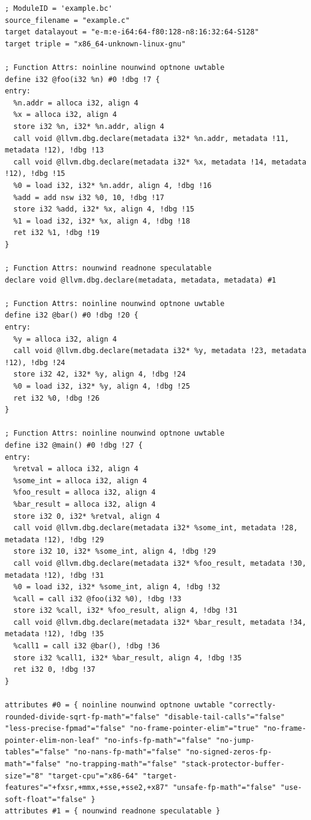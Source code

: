 \documentclass[12pt, twoside]{fithesis2}
\renewcommand{\_}{\leavevmode \kern0.07em\vbox{\hrule width0.4em}}
\begin{document}
\begin{verbatim}
; ModuleID = 'example.bc'
source_filename = "example.c"
target datalayout = "e-m:e-i64:64-f80:128-n8:16:32:64-S128"
target triple = "x86_64-unknown-linux-gnu"

; Function Attrs: noinline nounwind optnone uwtable
define i32 @foo(i32 %n) #0 !dbg !7 {
entry:
  %n.addr = alloca i32, align 4
  %x = alloca i32, align 4
  store i32 %n, i32* %n.addr, align 4
  call void @llvm.dbg.declare(metadata i32* %n.addr, metadata !11, metadata !12), !dbg !13
  call void @llvm.dbg.declare(metadata i32* %x, metadata !14, metadata !12), !dbg !15
  %0 = load i32, i32* %n.addr, align 4, !dbg !16
  %add = add nsw i32 %0, 10, !dbg !17
  store i32 %add, i32* %x, align 4, !dbg !15
  %1 = load i32, i32* %x, align 4, !dbg !18
  ret i32 %1, !dbg !19
}

; Function Attrs: nounwind readnone speculatable
declare void @llvm.dbg.declare(metadata, metadata, metadata) #1

; Function Attrs: noinline nounwind optnone uwtable
define i32 @bar() #0 !dbg !20 {
entry:
  %y = alloca i32, align 4
  call void @llvm.dbg.declare(metadata i32* %y, metadata !23, metadata !12), !dbg !24
  store i32 42, i32* %y, align 4, !dbg !24
  %0 = load i32, i32* %y, align 4, !dbg !25
  ret i32 %0, !dbg !26
}

; Function Attrs: noinline nounwind optnone uwtable
define i32 @main() #0 !dbg !27 {
entry:
  %retval = alloca i32, align 4
  %some_int = alloca i32, align 4
  %foo_result = alloca i32, align 4
  %bar_result = alloca i32, align 4
  store i32 0, i32* %retval, align 4
  call void @llvm.dbg.declare(metadata i32* %some_int, metadata !28, metadata !12), !dbg !29
  store i32 10, i32* %some_int, align 4, !dbg !29
  call void @llvm.dbg.declare(metadata i32* %foo_result, metadata !30, metadata !12), !dbg !31
  %0 = load i32, i32* %some_int, align 4, !dbg !32
  %call = call i32 @foo(i32 %0), !dbg !33
  store i32 %call, i32* %foo_result, align 4, !dbg !31
  call void @llvm.dbg.declare(metadata i32* %bar_result, metadata !34, metadata !12), !dbg !35
  %call1 = call i32 @bar(), !dbg !36
  store i32 %call1, i32* %bar_result, align 4, !dbg !35
  ret i32 0, !dbg !37
}

attributes #0 = { noinline nounwind optnone uwtable "correctly-rounded-divide-sqrt-fp-math"="false" "disable-tail-calls"="false" "less-precise-fpmad"="false" "no-frame-pointer-elim"="true" "no-frame-pointer-elim-non-leaf" "no-infs-fp-math"="false" "no-jump-tables"="false" "no-nans-fp-math"="false" "no-signed-zeros-fp-math"="false" "no-trapping-math"="false" "stack-protector-buffer-size"="8" "target-cpu"="x86-64" "target-features"="+fxsr,+mmx,+sse,+sse2,+x87" "unsafe-fp-math"="false" "use-soft-float"="false" }
attributes #1 = { nounwind readnone speculatable }


\end{verbatim}
\end{document}
